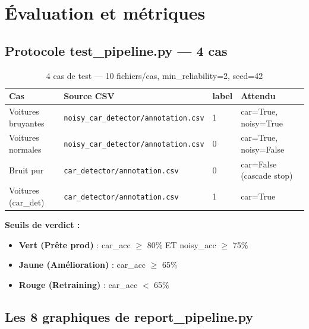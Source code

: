\documentclass[11pt,a4paper]{article}
\newcommand{\code}[1]{\texttt{\small #1}}
\newcommand{\critical}[1]{\textcolor{dangertext}{\textbf{#1}}}
\newcommand{\ok}[1]{\textcolor{green!50!black}{\textbf{#1}}}
\newcommand{\warn}[1]{\textcolor{orange!70!black}{\textbf{#1}}}
\begin{document}
\section{Évaluation et métriques}

\subsection{Protocole test\_pipeline.py — 4 cas}

\begin{table}[htbp]
\centering
\begin{tabular}{@{}llll@{}}
\toprule
\textbf{Cas} & \textbf{Source CSV} & \textbf{label} & \textbf{Attendu} \\
\midrule
Voitures bruyantes & \code{noisy\_car\_detector/annotation.csv} & 1 & car=True, noisy=True \\
Voitures normales & \code{noisy\_car\_detector/annotation.csv} & 0 & car=True, noisy=False \\
Bruit pur & \code{car\_detector/annotation.csv} & 0 & car=False (cascade stop) \\
Voitures (car\_det) & \code{car\_detector/annotation.csv} & 1 & car=True \\
\bottomrule
\end{tabular}
\caption{4 cas de test — 10 fichiers/cas, min\_reliability=2, seed=42}
\end{table}

\textbf{Seuils de verdict :}
\begin{itemize}
  \item \ok{Vert (Prête prod)} : car\_acc $\geq$ 80\% ET noisy\_acc $\geq$ 75\%
  \item \warn{Jaune (Amélioration)} : car\_acc $\geq$ 65\%
  \item \critical{Rouge (Retraining)} : car\_acc $<$ 65\%
\end{itemize}

\subsection{Les 8 graphiques de report\_pipeline.py}
\end{document}
